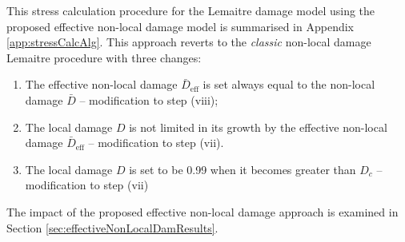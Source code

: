 \documentclass[sn-mathphys,Numbered]{sn-jnl}%
\begin{document}




This stress calculation procedure for the Lemaitre damage model using the proposed effective non-local damage model is summarised in Appendix \ref{app:stressCalcAlg}. %
This approach reverts to the \emph{classic} non-local damage Lemaitre procedure with three changes:
\begin{enumerate}[label=(\alph*)]
	\item The effective non-local damage $\bar{D}_\text{eff}$ is set always equal to the non-local damage $\bar{D}$ -- modification to step (viii);
	\item The local damage $D$ is not limited in its growth by the effective non-local damage $\bar{D}_\text{eff}$ -- modification to step (vii).
	\item The local damage $D$ is set to be 0.99 when it becomes greater than $D_c$ -- modification to step (vii)
\end{enumerate}
The impact of the proposed effective non-local damage approach is examined in Section \ref{sec:effectiveNonLocalDamResults}.
\end{document}
